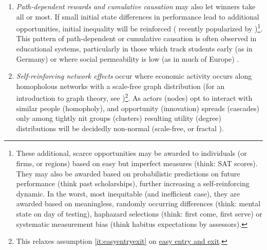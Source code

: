 \begin{enumerate}
	The truth, as often, will lie somewhere in between, and greatly depend on circumstance. Some of the divergence between scalable and unscalable occupations will fall on workers, some on consumers and much will be split\footnote{
		Such flexibility does justice to \cite{Baumol1965} original insight, which started out as an empirical observation on the relative pay of the performing arts, and not as an(other) iron law of wages (c.f. \citealt{Malthus1798}).}. 

	\item {} \label{sec:cumulativecausation} \emph{Path-dependent rewards and cumulative causation} may also let winners take all or most. If small initial state differences in performance lead to additional opportunities, initial inequality will be reinforced (\citealt{Jackson1968, Merton1988} recently popularized by \citealt{Gladwell})\footnote{
		These additional, scarce opportunities may be awarded to individuals (or firms, or regions) based on easy but imperfect measures (think: SAT scores). They may also be awarded based on probabilistic predictions on future performance (think past scholarships), further increasing a self-reinforcing dynamic. In the worst, most inequitable (and inefficient case), they are awarded based on meaningless, randomly occurring differences (think: mental state on day of testing), haphazard selections (think: first come, first serve) or systematic measurement bias (think habitus expectations by assessors).}. 
	This pattern of path-dependent or cumulative causation is often observed in educational systems, particularly in those which track students early (as in Germany) or where social permeability is low (as in much of Europe) \citep{OECD2006}.

	\item {} \label{sec:networkeffects} \emph{Self-reinforcing network effects} occur where economic activity occurs along homopholous networks with a scale-free graph distribution (for an introduction to graph theory, see \citealt{Kleinberg-2009-oz})\footnote{
		This relaxes  assumption \ref{it:easyentryexit} on \hyperref[it:easyentryexit]{easy entry and exit}.}.
	As actors (nodes) opt to interact with similar people (homopholy), and opportunity (innovation) spreads (cascades) only among tightly nit groups (clusters) \citep{Bass1969} resulting utility (degree) distributions will be decidedly non-normal (scale-free, or fractal \citep{Mandelbrot2004}). 
	
	

\end{enumerate}
